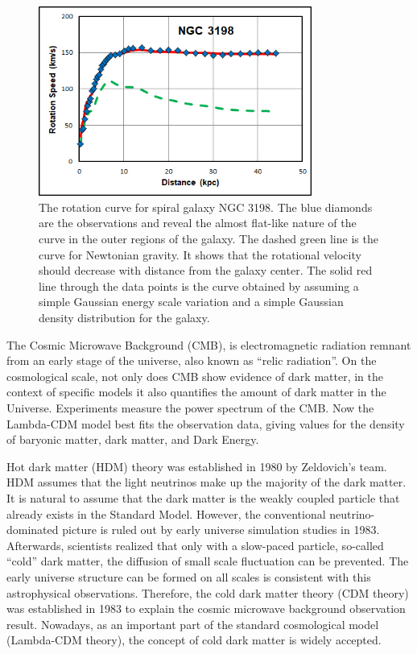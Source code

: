 \begin{figure}[htbp]
  \begin{center}
    \includegraphics[width=0.8\textwidth]{chapters/c2/figures/ngc3198_sparc.jpg}
  \end{center}
  \caption{The rotation curve for spiral galaxy NGC 3198. The blue diamonds are the observations and reveal the almost flat-like nature of the curve in the outer regions of the galaxy. The dashed green line is the curve for Newtonian gravity. It shows that the rotational velocity should decrease with distance from the galaxy center. The solid red line through the data points is the curve obtained by assuming a simple Gaussian energy scale variation and a simple Gaussian density distribution for the galaxy.}
  \label{fig:rotation}
\end{figure}

\par The Cosmic Microwave Background (CMB), is electromagnetic radiation remnant from an early stage of the universe, also known as ``relic radiation''. On the cosmological scale, not only does CMB show evidence of dark matter, in the context of specific models it also quantifies the amount of dark matter in the Universe. Experiments measure the power spectrum of the CMB. Now the Lambda-CDM model best fits the observation data, giving values for the density of baryonic matter, dark matter, and Dark Energy.

\par Hot dark matter (HDM) theory\cite{Zeldovich:1982zz} was established in 1980 by Zeldovich's team. HDM assumes that the light neutrinos make up the majority of the dark matter. It is natural to assume that the dark matter is the weakly coupled particle that already exists in the Standard Model. However, the conventional neutrino-dominated picture is ruled out by early universe simulation studies in 1983\cite{White:1984yj}. Afterwards, scientists realized that only with a slow-paced particle, so-called ``cold'' dark matter, the diffusion of small scale fluctuation can be prevented. The early universe structure can be formed on all scales is consistent with this astrophysical observations. Therefore, the cold dark matter theory (CDM theory)\cite{PhysRevLett.48.223} was established in 1983 to explain the cosmic microwave background observation result. Nowadays, as an important part of the standard cosmological model (Lambda-CDM theory), the concept of cold dark matter is widely accepted. 

